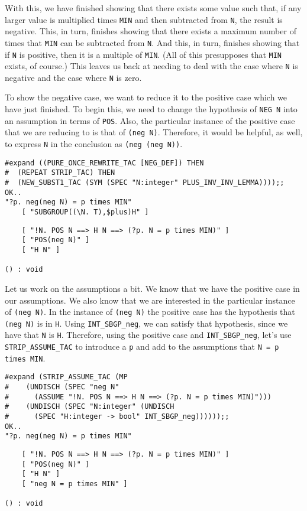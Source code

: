 With this, we have finished showing that there exists some value
such that, if any larger value is multiplied times {\small\verb+MIN+}
and then subtracted from {\small\tt N}, the result is negative.  This,
in turn, finishes showing that there exists a maximum number of times
that {\small\verb+MIN+} can be subtracted from {\small\tt N}.  And
this, in turn, finishes showing that if {\small\tt N} is positive,
then it is a multiple of {\small\verb+MIN+}.  (All of this presupposes
that {\small\verb+MIN+} exists, of course.)  This leaves us back at
needing to deal with the case where {\small\tt N} is negative and the
case where {\small\tt N} is zero.

To show the negative case, we want to reduce it to the positive case
which we have just finished.  To begin this, we need to change the
hypothesis of {\small\verb+NEG N+} into an assumption in terms of
{\small\verb+POS+}.  Also, the particular instance of the positive
case that we are reducing to is that of {\small\verb+(neg N)+}.
Therefore, it would be helpful, as well, to express {\small\tt N} in
the conclusion as {\small\verb+(neg (neg N))+}. 
\begin{session}
\begin{verbatim}
#expand ((PURE_ONCE_REWRITE_TAC [NEG_DEF]) THEN
#  (REPEAT STRIP_TAC) THEN
#  (NEW_SUBST1_TAC (SYM (SPEC "N:integer" PLUS_INV_INV_LEMMA))));;
OK..
"?p. neg(neg N) = p times MIN"
    [ "SUBGROUP((\N. T),$plus)H" ]
\end{verbatim}
\mvdots
\begin{verbatim}
    [ "!N. POS N ==> H N ==> (?p. N = p times MIN)" ]
    [ "POS(neg N)" ]
    [ "H N" ]

() : void
\end{verbatim}
\end{session}

Let us work on the assumptions a bit.  We know that we have the
positive case in our assumptions.  We also know that we are interested
in the particular instance of {\small\verb+(neg N)+}.  In the instance
of {\small\verb+(neg N)+} the positive case has the hypothesis that
{\small\verb+(neg N)+} is in {\small\tt H}.  Using
{\small\verb+INT_SBGP_neg+}, we can satisfy that hypothesis, since we
have that {\small\tt N} is {\small\tt H}.  Therefore, using the
positive case and {\small\verb+INT_SBGP_neg+}, let's use
{\small\verb+STRIP_ASSUME_TAC+} to introduce a {\small\tt p} and add
to the assumptions that {\small\verb+N = p times MIN+}.
\begin{session}
\begin{verbatim}
#expand (STRIP_ASSUME_TAC (MP
#    (UNDISCH (SPEC "neg N"
#      (ASSUME "!N. POS N ==> H N ==> (?p. N = p times MIN)")))
#    (UNDISCH (SPEC "N:integer" (UNDISCH
#      (SPEC "H:integer -> bool" INT_SBGP_neg))))));;
OK..
"?p. neg(neg N) = p times MIN"
\end{verbatim}
\mvdots
\begin{verbatim}
    [ "!N. POS N ==> H N ==> (?p. N = p times MIN)" ]
    [ "POS(neg N)" ]
    [ "H N" ]
    [ "neg N = p times MIN" ]

() : void
\end{verbatim}
\end{session}

